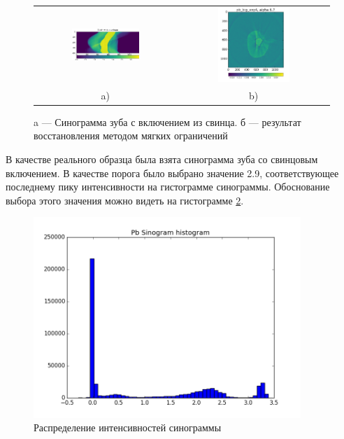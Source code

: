 \begin{figure}
\centering
\begin{tabular}{@{}c@{}c}
    \includegraphics[width=0.50\textwidth]{Dissertation/images/part2_img/tooth_sino}
&
    \includegraphics[width=0.50\textwidth]{Dissertation/images/part2_img/soft_ineq_pb_tooth}
\\
   \small a) & \small b)
\end{tabular}
  \caption{a --- Синограмма зуба с включением из свинца. б --- результат восстановления методом мягких ограничений}
\label{fig:tooth_sino_rec}
\end{figure}

В качестве реального образца была взята синограмма зуба со свинцовым включением.
В качестве порога было выбрано значение 2.9, соответствующее последнему пику интенсивности на гистограмме синограммы.
Обоснование выбора этого значения можно видеть на гистограмме \ref{fig:pb_hist}.


\begin{figure}
	\centering
	\includegraphics[width=0.9\textwidth]{Dissertation/images/part2_img/pb_hist}
	\caption{Распределение интенсивностей синограммы}
	\label{fig:pb_hist}
\end{figure}



